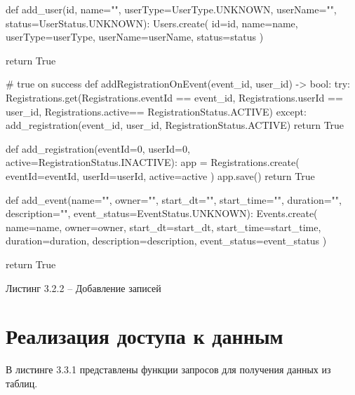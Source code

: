 \documentclass[12pt,a4paper,oneside]{report}
\begin{document}
\begin{python}
def add_user(id, name="", userType=UserType.UNKNOWN, userName="", status=UserStatus.UNKNOWN):
    Users.create(
        id=id,
        name=name,
        userType=userType,
        userName=userName,
        status=status
    )

    return True

# true on success
def addRegistrationOnEvent(event_id, user_id) -> bool:
    try:
        Registrations.get(Registrations.eventId == event_id,
                          Registrations.userId == user_id,
                          Registrations.active==   RegistrationStatus.ACTIVE)
    except:
        add_registration(event_id,
 user_id, RegistrationStatus.ACTIVE)
        return True

def add_registration(eventId=0, 
userId=0, active=RegistrationStatus.INACTIVE):
    app = Registrations.create(
        eventId=eventId,
        userId=userId,
        active=active
    )
    app.save()
    return True 


def add_event(name="", owner="", start_dt="", start_time="",
              duration="",
 description="", event_status=EventStatus.UNKNOWN):
    Events.create(
        name=name,
        owner=owner,
        start_dt=start_dt,
        start_time=start_time,
        duration=duration,
        description=description,
        event_status=event_status
    )

    return True

\end{python}

\begin{center}
    Листинг 3.2.2 –  Добавление записей
\end{center}

\section{Реализация доступа к данным}
\quad В листинге 3.3.1 представлены функции запросов для получения данных из таблиц. 
\end{document}
